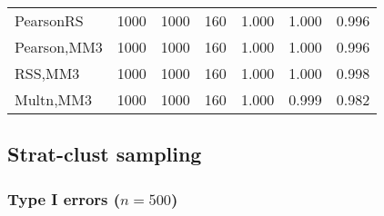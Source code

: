 \documentclass[
]{article}
\begin{document}
\begin{table}[H]
{\begin{tabular}[t]{lrrrrrr}
\hspace{1em}PearsonRS & 1000 & 1000 & 160 & 1.000 & 1.000 & 0.996\\
\hspace{1em}Pearson,MM3 & 1000 & 1000 & 160 & 1.000 & 1.000 & 0.996\\
\hspace{1em}RSS,MM3 & 1000 & 1000 & 160 & 1.000 & 1.000 & 0.998\\
\hspace{1em}Multn,MM3 & 1000 & 1000 & 160 & 1.000 & 0.999 & 0.982\\
\bottomrule
\end{tabular}}
\end{table}

\hypertarget{strat-clust-sampling}{%
\subsection{Strat-clust sampling}\label{strat-clust-sampling}}

\hypertarget{type-i-errors-n500-3}{%
\subsubsection{\texorpdfstring{Type I errors
(\(n=500\))}{Type I errors (n=500)}}\label{type-i-errors-n500-3}}
\end{document}

